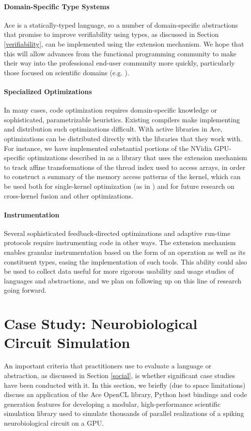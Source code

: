 \documentclass{sig-alternate}
\begin{document}
\paragraph{Domain-Specific Type Systems}
Ace is a statically-typed language, so a number of domain-specific abstractions that promise to improve verifiability using types, as discussed in Section \ref{verifiability}, can be implemented using the extension mechanism. We hope that this will allow advances from the functional programming community to make their way into the professional end-user community more quickly, particularly those focused on scientific domains (e.g. \cite{conf/cefp/Kennedy09}).

\paragraph{Specialized Optimizations}
In many cases, code optimization requires domain-specific knowledge or sophisticated, parametrizable heuristics. Existing compilers make implementing and distribution such optimizations difficult. With active libraries in Ace, optimizations can be distributed directly with the libraries that they work with. For instance, we have implemented substantial portions of the NVidia GPU-specific optimizations described in \cite{yang2010gpgpu} as a library that uses the extension mechanism to track affine transformations of the thread index used to access arrays, in order to construct a summary of the memory access patterns of the kernel, which can be used both for single-kernel optimization (as in \cite{yang2010gpgpu}) and for future research on cross-kernel fusion and other optimizations.

\paragraph{Instrumentation}
Several sophisticated feedback-directed optimizations and adaptive run-time protocols require instrumenting code in other ways. The extension mechanism enables granular instrumentation based on the form of an operation as well as its constituent types, easing the implementation of such tools. This ability could also be used to collect data useful for more rigorous usability and usage studies of languages and abstractions, and we plan on following up on this line of research going forward.


\section{Case Study: Neurobiological Circuit Simulation}
An important criteria that practitioners use to evaluate a language or abstraction, as discussed in Section \ref{social}, is whether significant case studies have been conducted with it. In this section, we briefly (due to space limitations) discuss an application of the Ace OpenCL library, Python host bindings and code generation features for developing a modular, high-performance scientific simulation library used to simulate  thousands of parallel realizations of a spiking neurobiological circuit on a GPU.
\end{document}
